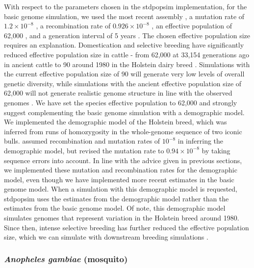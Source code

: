 \documentclass[hidelinks]{article}
\begin{document}
With respect to the parameters chosen in the stdpopsim implementation,
for the basic genome simulation, we used the most recent assembly
\citep{Rosen2020}, a mutation rate of \(1.2 \times 10^{-8}\) \citep{Harland2017},
a recombination rate of \(0.926 \times 10^{-8}\) \citep{Ma2015}, an
effective population of 62,000 \citep{MacLeod2013}, and a generation interval of 5
years \citep{MacLeod2013}. The chosen effective population size requires
an explanation. Domestication and selective breeding have significantly reduced
effective population size in cattle - from 62,000 at 33,154 generations ago in
ancient cattle to 90 around 1980 in the Holstein dairy breed \citep{MacLeod2013}.
Simulations with the current effective population size of 90 will generate very
low levels of overall genetic diversity, while simulations with the ancient
effective population size of 62,000 will not generate realistic genome structure
in line with the observed genomes \citep[e.g.,][]{Rosen2020}. We have set
the species effective population to 62,000 and strongly suggest complementing the
basic genome simulation with a demographic model. We implemented
the \cite{MacLeod2013} demographic model of the Holstein breed, which was
inferred from runs of homozygosity in the whole-genome sequence of two
iconic bulls. \cite{MacLeod2013} assumed
recombination and mutation rates of \(10^{-8}\) in inferring the
demographic model, but revised the mutation rate to \(0.94 \times 10^{-8}\) by
taking sequence errors into account. In line with the advice given in
previous sections, we implemented these mutation and recombination rates
for the \cite{MacLeod2013} demographic model, even though we have implemented
more recent estimates in the basic genome model. When a simulation with this
demographic model is requested, stdpopsim uses the estimates from the
demographic model rather than the estimates from the basic genome model.
Of note, this demographic model simulates genomes that represent variation
in the Holstein breed around 1980. Since then, intense selective breeding has
further reduced the effective population size, which we can simulate with
downstream breeding simulations \citep[e.g.,][]{MacLeod2014, Gaynor2020, Obsteter2021}. 

\hypertarget{ano-gambea}{%
	\subsubsection*{\texorpdfstring{\emph{Anopheles gambiae} (mosquito)}{Anopheles gambiae (mosquito)}}\label{bos-taurus}}
\end{document}

